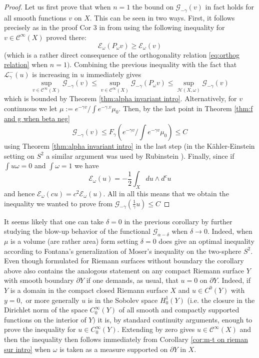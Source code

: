\documentclass[11pt,oneside,english]{amsart}
\numberwithin{equation}{section}
\numberwithin{figure}{section}
\theoremstyle{plain}
\theoremstyle{plain}
\theoremstyle{plain}
\theoremstyle{plain}
\theoremstyle{remark}
\theoremstyle{definition}
\begin{document}
\begin{proof}
Let us first prove that when $n=1$ the bound on $\mathcal{G}_{-\gamma}(v)$
in fact holds for all smooth functions $v$ on $X.$ This can be seen
in two ways. First, it follows precisely as in the proof Cor 3 in
\cite{b0} from using the following inequality for $v\in\mathcal{C}^{\infty}(X)$
proved there: 
\[
\mathcal{E}_{\omega}(P_{\omega}v)\geq\mathcal{E}_{\omega}(v)
\]
 (which is a rather direct consequence of the orthogonality relation
\ref{eq:orthog relation} when $n=1).$ Combining the previous inequality
with the fact that $\mathcal{L}_{\gamma}^{-}(u)$ is increasing in
$u$ immediately gives 
\[
\sup_{v\in\mathcal{C}^{\infty}(X)}\mathcal{G}_{-\gamma}(v)\leq\sup_{v\in\mathcal{C}^{\infty}(X)}\mathcal{G}_{-\gamma}(P_{\omega}v)\leq\sup_{\mathcal{H}(X,\omega)}\mathcal{G}_{-\gamma}(v)
\]
 which is bounded by Theorem \ref{thm:alpha invariant intro}. Alternatively,
for $v$ continuous we let $\mu:=e^{-\gamma v}/\int e^{-\gamma.v}\mu_{0}.$
Then, by the last point in Theorem \ref{thm:f and g when beta neg}
\[
\mathcal{G}_{-\gamma}(v)\leq F_{\gamma}(e^{-\gamma v}/\int e^{-\gamma v}\mu_{0})\leq C
\]
 using Theorem \ref{thm:alpha invariant intro} in the last step (in
the Kähler-Einstein setting on $S^{2}$ a similar argument was used
by Rubinstein \cite{rub0}). Finally, since if $\int u\omega=0$ and
$\int\omega=1$ we have 
\[
\mathcal{E}_{\omega}(u)=-\frac{1}{2}\int_{X}du\wedge d^{c}u
\]
 and hence $\mathcal{E}_{\omega}(cu)=c^{2}\mathcal{E}_{\omega}(u).$
All in all this means that we obtain the inequality we wanted to prove
from $\mathcal{G}_{-\gamma}(\frac{1}{\gamma}u)\leq C$ 
\end{proof}
It seems likely that one can take $\delta=0$ in the previous corollary
by further studying the blow-up behavior of the functional \emph{$\mathcal{G}_{\alpha-\delta}$}
when $\delta\rightarrow0.$ Indeed, when $\mu$ is a volume (are rather
area) form setting $\delta=0$ does give an optimal inequality according
to Fontana's generalization \cite{cher} of Moser's inequality on
the two-sphere $S^{2}.$ Even though formulated for Riemann surfaces
without boundary the corollary above also contains the analogous statement
on any compact Riemann surface $Y$ with smooth boundary $\partial Y$
if one demands, as usual, that $u=0$ on $\partial Y.$ Indeed, if
$Y$ is a domain in the compact closed Riemann surface $X$ and $u\in C^{0}(Y)$
with $y=0,$ or more generally $u$ is in the Sobolev space $H_{0}^{1}(Y)$
(i.e. the closure in the Dirichlet norm of the space $C_{0}^{\infty}(Y)$
of all smooth and compactly supported functions on the interior of
$Y)$ it is, by standard continuity arguments, enough to prove the
inequality for $u\in C_{0}^{\infty}(Y).$ Extending by zero gives
$u\in\mathcal{C}^{\infty}(X)$ and then the inequality then follows
immediately from Corollary \ref{cor:m-t on rieman sur intro} when
$\omega$ is taken as a measure supported on $\partial Y$ in $X.$ 
\end{document}
